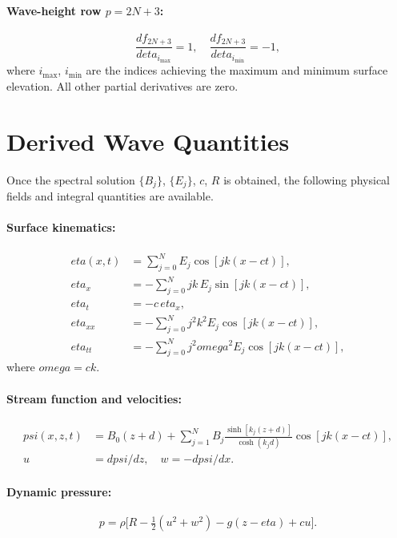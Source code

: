\documentclass[journal,10pt,twocolumn]{IEEEtran}
\def\omega{omega}%
\def\eta{eta}%
\def\psi{psi}%
\def\partial{d}%
\newcommand{\half}{\tfrac{1}{2}}
\begin{document}
\paragraph{Wave-height row $p=2N+3$:}
\[
    \frac{\partial f_{2N+3}}{\partial\eta_{i_{\max}}}=1,
    \quad
    \frac{\partial f_{2N+3}}{\partial\eta_{i_{\min}}}=-1,
\]
where $i_{\max}$, $i_{\min}$ are the indices achieving the maximum
and minimum surface elevation.
All other partial derivatives are zero.

\section{Derived Wave Quantities}
\label{sec:derived_quantities}

Once the spectral solution $\{B_j\}$, $\{E_j\}$, $c$, $R$ is
obtained, the following physical fields and integral quantities
are available.

\paragraph{Surface kinematics:}
\begin{align}
    \eta(x,t)     &= \sum_{j=0}^N E_j\cos[jk(x-ct)],\\
    \eta_x        &= -\sum_{j=0}^N jk\,E_j\sin[jk(x-ct)],\\
    \eta_t        &= -c\,\eta_x,\\
    \eta_{xx}     &= -\sum_{j=0}^N j^2k^2 E_j\cos[jk(x-ct)],\\
    \eta_{tt}     &= -\sum_{j=0}^N j^2\omega^2 E_j\cos[jk(x-ct)],
\end{align}
where $\omega = ck$.

\paragraph{Stream function and velocities:}
\begin{align}
    \psi(x,z,t)
    &= B_0(z+d) + \sum_{j=1}^N B_j
    \frac{\sinh[k_j(z+d)]}{\cosh(k_j d)}
    \cos[jk(x-ct)],\\
    u &= \partial\psi/\partial z,
    \quad
    w = -\partial\psi/\partial x.
\end{align}

\paragraph{Dynamic pressure:}
\begin{equation}
    p = \rho\bigl[R - \half(u^2+w^2) - g(z-\eta) + cu\bigr].
\end{equation}
\end{document}
